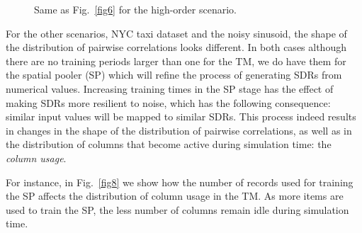 \documentclass[11pt,letterpaper]{article}
\begin{document}
\begin{figure}[t]
{	    			\label{fig7:c}
		    	}
			    \caption{
			        Same as Fig.~\ref{fig6} for the high-order scenario.
			    }
			    \label{fig7}
		    \end{figure}		    
            
            For the other scenarios, NYC taxi dataset and the noisy sinusoid, the shape of the distribution
            of pairwise correlations looks different.
            In both cases although there are no training periods larger than one for the TM, we do have them for the spatial pooler (SP)
            which will refine the process of generating SDRs from numerical values.
            Increasing training times in the SP stage has the effect of making SDRs more resilient to noise,
            which has the following consequence: similar input values will be mapped to similar SDRs.
            This process indeed results in changes in the shape of the distribution of pairwise correlations, as well
            as in the distribution of columns that become active during simulation time: the \emph{column usage}.
            
            For instance, in Fig.~\ref{fig8} we show how the number of records used for training the SP
            affects the distribution of column usage in the TM. As more items are used to train the SP, the
            less number of columns remain idle during simulation time.
\end{document}
